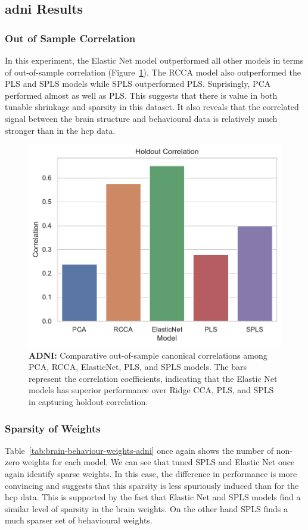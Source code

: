 \subsection{\acrshort{adni} Results}\label{subsec:adni}


\subsubsection{Out of Sample Correlation}

In this experiment, the Elastic Net model outperformed all other models in terms of out-of-sample correlation (Figure~\ref{fig:adni-performance}).
The RCCA model also outperformed the PLS and SPLS models while SPLS outperformed PLS.
Suprisingly, PCA performed almost as well as PLS.
This suggests that there is value in both tunable shrinkage and sparsity in this dataset.
It also reveals that the correlated signal between the brain structure and behavioural data is relatively much stronger than in the \acrshort{hcp} data.

\begin{figure}
    \centering
    \includegraphics[width=0.5\linewidth]{figures/adni/holdout_correlations}
    \caption{\textbf{ADNI:} Comparative out-of-sample canonical correlations among PCA, RCCA, ElasticNet, PLS, and SPLS models. The bars represent the correlation coefficients, indicating that the Elastic Net models has superior performance over Ridge CCA, PLS, and SPLS in capturing holdout correlation.}\label{fig:adni-performance}
\end{figure}

\subsubsection{Sparsity of Weights}

Table~\ref{tab:brain-behaviour-weights-adni} once again shows the number of non-zero \gls{weights} for each model.
We can see that tuned SPLS and Elastic Net once again identify sparse weights.
In this case, the difference in performance is more convincing and suggests that this sparsity is less spuriously induced than for the \acrshort{hcp} data.
This is supported by the fact that Elastic Net and SPLS models find a similar level of sparsity in the brain weights.
On the other hand SPLS finds a much sparser set of behavioural weights.

